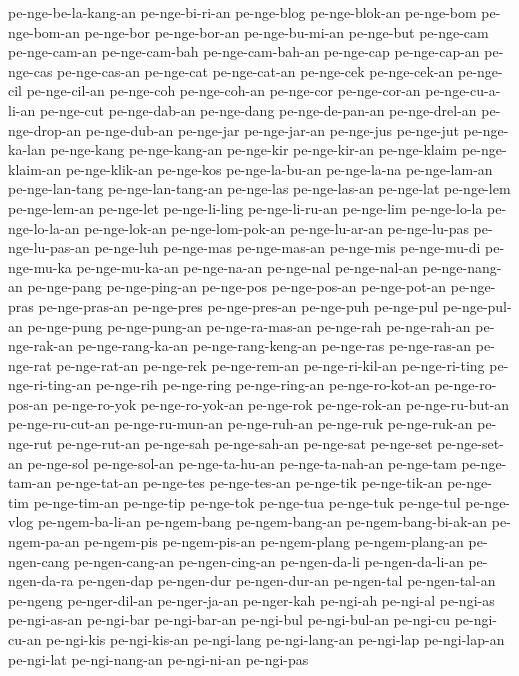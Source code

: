 {pe-nge-be-la-kang-an pe-nge-bi-ri-an pe-nge-blog pe-nge-blok-an pe-nge-bom
pe-nge-bom-an pe-nge-bor pe-nge-bor-an pe-nge-bu-mi-an pe-nge-but
pe-nge-cam pe-nge-cam-an pe-nge-cam-bah pe-nge-cam-bah-an pe-nge-cap
pe-nge-cap-an pe-nge-cas pe-nge-cas-an pe-nge-cat pe-nge-cat-an pe-nge-cek
pe-nge-cek-an pe-nge-cil pe-nge-cil-an pe-nge-coh pe-nge-coh-an pe-nge-cor
pe-nge-cor-an pe-nge-cu-a-li-an pe-nge-cut pe-nge-dab-an pe-nge-dang
pe-nge-de-pan-an pe-nge-drel-an pe-nge-drop-an pe-nge-dub-an pe-nge-jar
pe-nge-jar-an pe-nge-jus pe-nge-jut pe-nge-ka-lan pe-nge-kang
pe-nge-kang-an pe-nge-kir pe-nge-kir-an pe-nge-klaim pe-nge-klaim-an
pe-nge-klik-an pe-nge-kos pe-nge-la-bu-an pe-nge-la-na pe-nge-lam-an
pe-nge-lan-tang pe-nge-lan-tang-an pe-nge-las pe-nge-las-an pe-nge-lat
pe-nge-lem pe-nge-lem-an pe-nge-let pe-nge-li-ling pe-nge-li-ru-an
pe-nge-lim pe-nge-lo-la pe-nge-lo-la-an pe-nge-lok-an pe-nge-lom-pok-an
pe-nge-lu-ar-an pe-nge-lu-pas pe-nge-lu-pas-an pe-nge-luh pe-nge-mas
pe-nge-mas-an pe-nge-mis pe-nge-mu-di pe-nge-mu-ka pe-nge-mu-ka-an
pe-nge-na-an pe-nge-nal pe-nge-nal-an pe-nge-nang-an pe-nge-pang
pe-nge-ping-an pe-nge-pos pe-nge-pos-an pe-nge-pot-an pe-nge-pras
pe-nge-pras-an pe-nge-pres pe-nge-pres-an pe-nge-puh pe-nge-pul
pe-nge-pul-an pe-nge-pung pe-nge-pung-an pe-nge-ra-mas-an pe-nge-rah
pe-nge-rah-an pe-nge-rak-an pe-nge-rang-ka-an pe-nge-rang-keng-an
pe-nge-ras pe-nge-ras-an pe-nge-rat pe-nge-rat-an pe-nge-rek pe-nge-rem-an
pe-nge-ri-kil-an pe-nge-ri-ting pe-nge-ri-ting-an pe-nge-rih pe-nge-ring
pe-nge-ring-an pe-nge-ro-kot-an pe-nge-ro-pos-an pe-nge-ro-yok
pe-nge-ro-yok-an pe-nge-rok pe-nge-rok-an pe-nge-ru-but-an
pe-nge-ru-cut-an pe-nge-ru-mun-an pe-nge-ruh-an pe-nge-ruk pe-nge-ruk-an
pe-nge-rut pe-nge-rut-an pe-nge-sah pe-nge-sah-an pe-nge-sat pe-nge-set
pe-nge-set-an pe-nge-sol pe-nge-sol-an pe-nge-ta-hu-an pe-nge-ta-nah-an
pe-nge-tam pe-nge-tam-an pe-nge-tat-an pe-nge-tes pe-nge-tes-an pe-nge-tik
pe-nge-tik-an pe-nge-tim pe-nge-tim-an pe-nge-tip pe-nge-tok pe-nge-tua
pe-nge-tuk pe-nge-tul pe-nge-vlog pe-ngem-ba-li-an pe-ngem-bang
pe-ngem-bang-an pe-ngem-bang-bi-ak-an pe-ngem-pa-an pe-ngem-pis
pe-ngem-pis-an pe-ngem-plang pe-ngem-plang-an pe-ngen-cang pe-ngen-cang-an
pe-ngen-cing-an pe-ngen-da-li pe-ngen-da-li-an pe-ngen-da-ra pe-ngen-dap
pe-ngen-dur pe-ngen-dur-an pe-ngen-tal pe-ngen-tal-an pe-ngeng
pe-nger-dil-an pe-nger-ja-an pe-nger-kah pe-ngi-ah pe-ngi-al pe-ngi-as
pe-ngi-as-an pe-ngi-bar pe-ngi-bar-an pe-ngi-bul pe-ngi-bul-an pe-ngi-cu
pe-ngi-cu-an pe-ngi-kis pe-ngi-kis-an pe-ngi-lang pe-ngi-lang-an
pe-ngi-lap pe-ngi-lap-an pe-ngi-lat pe-ngi-nang-an pe-ngi-ni-an pe-ngi-pas
}

